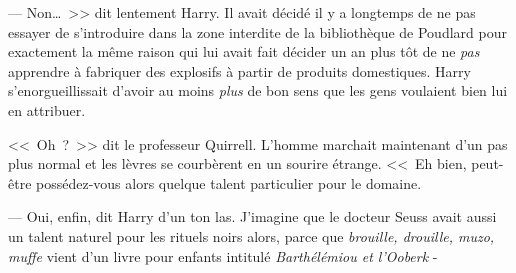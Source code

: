--- Non…~>> dit lentement Harry. Il avait décidé il y a longtemps de ne pas essayer de s'introduire dans la zone interdite de la bibliothèque de Poudlard pour exactement la même raison qui lui avait fait décider un an plus tôt de ne \emph{pas} apprendre à fabriquer des explosifs à partir de produits domestiques. Harry s'enorgueillissait d'avoir au moins \emph{plus} de bon sens que les gens voulaient bien lui en attribuer.

<<~Oh~?~>> dit le professeur Quirrell. L'homme marchait maintenant d'un pas plus normal et les lèvres se courbèrent en un sourire étrange. <<~Eh bien, peut-être possédez-vous alors quelque talent particulier pour le domaine.

--- Oui, enfin, dit Harry d'un ton las. J'imagine que le docteur Seuss avait aussi un talent naturel pour les rituels noirs alors, parce que \emph{brouille, drouille, muzo, muffe} vient d'un livre pour enfants intitulé \emph{Barthélémiou et l'Ooberk} -

